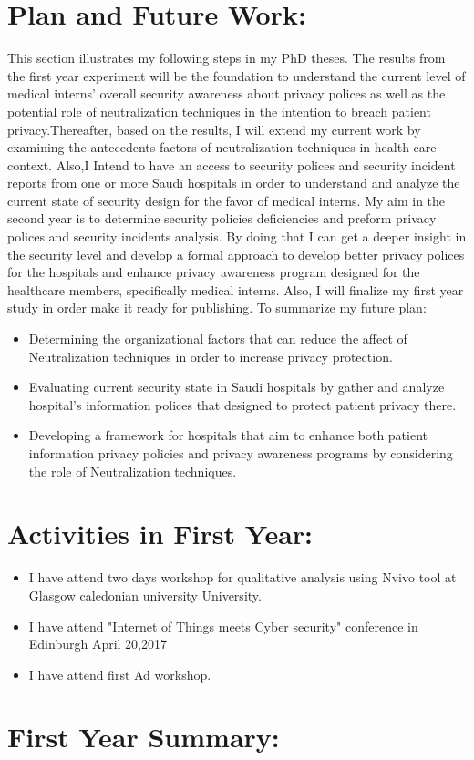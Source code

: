 \section{Plan and Future Work:}
This section illustrates my following steps in my PhD theses. The results from the first year experiment will be the foundation to understand the current level of medical interns' overall security awareness about privacy polices as well as the potential role of neutralization techniques in the intention to breach patient privacy.Thereafter, based on the results, I will extend my current work by examining the antecedents factors of neutralization techniques in health care context. Also,I Intend to have an access to security  polices and security incident reports from one or more Saudi hospitals in order to understand and analyze the current state of security design for the favor of medical interns. My aim in the second year is to determine security policies deficiencies and preform privacy polices and security incidents analysis. By doing that I can get a deeper insight in the security level and develop a formal approach to develop better privacy polices for the hospitals and enhance privacy awareness program designed for the healthcare members, specifically medical interns. Also, I will finalize my first year study in order make it ready for publishing. To summarize my future plan:
\begin{itemize}
	\item Determining the organizational factors that can reduce the affect of Neutralization techniques in order to increase privacy protection.  
	 \item Evaluating current security state in Saudi hospitals by gather and analyze hospital's information polices that designed to protect patient privacy there.
	 \item Developing a framework for hospitals that aim to enhance both patient information privacy policies and privacy awareness programs by considering the role of Neutralization techniques.
\end{itemize}
  
\section{Activities in First Year:}

\begin{itemize}
	\item I have attend two days workshop for qualitative analysis using Nvivo tool at Glasgow caledonian university University.
	\item I have attend "Internet of Things meets Cyber security" conference in Edinburgh April 20,2017
	\item I have attend first Ad workshop.
\end{itemize}

\section{First Year Summary:}
